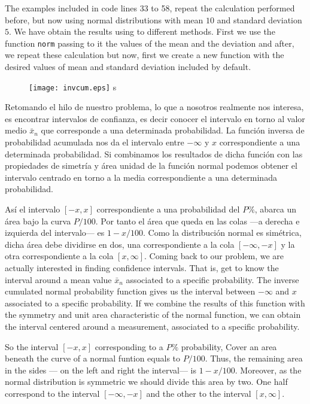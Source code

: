 \begin{paracol}{2}
The examples included in code lines 33 to 58, repeat the calculation performed before, but now using normal distributions with mean $10$ and standard deviation $5$. We have obtain the results using to different methods. First we use the function \texttt{norm} passing to it the values of the mean and the deviation and after, we repeat these calculation but now, first we create a new function with the desired values of mean and standard deviation included by default.   
\end{paracol}

\begin{figure}[h]
\centering
\texttt{[image: invcum.eps]}
\label{fig:invcum}s
\end{figure}

\begin{paracol}{2}
Retomando el hilo de nuestro problema, lo que a nosotros realmente nos interesa, es encontrar intervalos de confianza, es decir conocer el intervalo en torno al valor medio $\bar{x}_n$ que corresponde a una determinada probabilidad. La función inversa de probabilidad acumulada nos da el intervalo entre $-\infty$ y $x$ correspondiente a una determinada probabilidad. Si combinamos los resultados de dicha función con las propiedades de simetría y área unidad de la función normal podemos obtener el intervalo centrado en torno a la media correspondiente a una determinada probabilidad.

Así el intervalo $[-x ,x]$ correspondiente a  una probabilidad del $P\%$, abarca un área bajo la curva $P/100$. Por tanto el área que queda en las colas ---a derecha e izquierda del intervalo--- es $1-x/100$. Como la distribución normal es simétrica, dicha área debe dividirse en dos, una correspondiente a la cola $[-\infty, -x]$ y la otra correspondiente a la cola $[x, \infty]$.
\switchcolumn
Coming back to our problem, we are actually interested in finding confidence intervals. That is, get to know the interval around a mean value $\bar{x}_n$ associated to a specific probability. The inverse cumulated normal probability function gives us the interval between $-\infty$ and $x$ associated to a specific probability. If we combine the results of this function with the symmetry and unit area characteristic of the normal function, we can obtain the interval centered around a measurement, associated to a specific probability.

So the interval $[-x ,x]$ corresponding to a $P\%$ probability, Cover an area beneath the curve of a normal funtion equals to $P/100$. Thus, the remaining area in the sides  --- on the left and right the interval--- is $1-x/100$. Moreover, as the normal distribution is symmetric we should divide this area by two. One half correspond to the interval $[-\infty, -x]$ and the other to the interval $[x, \infty]$.
\end{paracol}

